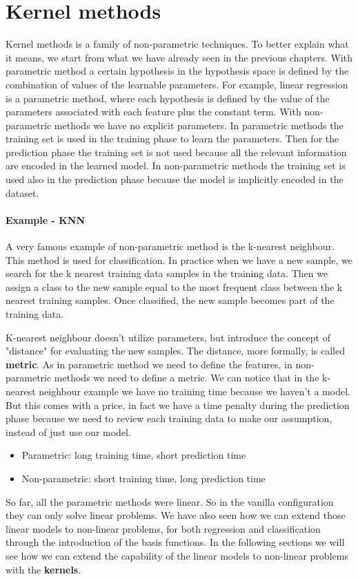 \documentclass[main.tex]{subfiles}
\begin{document}
\section{Kernel methods}
Kernel methods is a family of non-parametric techniques. To better explain what it means, we start from what we have already seen in the previous chapters. With parametric method a certain hypothesis in the hypothesis space is defined by the combination of values of the learnable parameters. For example, linear regression is a parametric method, where each hypothesis is defined by the value of the parameters associated with each feature plus the constant term.
With non-parametric methods we have no explicit parameters. %
In parametric methods the training set is used in the training phase to learn the parameters. Then for the prediction phase the training set is not used because all the relevant information are encoded in the learned model. In non-parametric methods the training set is used also in the prediction phase because the model is implicitly encoded in the dataset.
\paragraph{Example - KNN} A very famous example of non-parametric method is the k-nearest neighbour\footnotemark. This method is used for classification. In practice when we have a new sample, we search for the k nearest training data samples in the training data. Then we assign a class to the new sample equal to the most frequent class between the k nearest training samples. Once classified, the new sample becomes part of the training data. 

K-nearest neighbour doesn't utilize parameters, but introduce the concept of "distance" for evaluating the new samples. The distance, more formally, is called \textbf{metric}. As in parametric method we need to define the features, in non-parametric methods we need to define a metric.
We can notice that in the k-nearest neighbour example we have no training time because we haven't a model. But this comes with a price, in fact we have a time penalty during the prediction phase because we need to review each training data to make our assumption, instead of just use our model.
\begin{itemize}
    \item Parametric: long training time, short prediction time
    \item Non-parametric: short training time, long prediction time
\end{itemize}
So far, all the parametric methods were linear. So in the vanilla configuration they can only solve linear problems. We have also seen how we can extend those linear models to non-linear problems, for both regression and classification through the introduction of the basis functions. In the following sections we will see how we can extend the capability of the linear models to non-linear problems with the \textbf{kernels}.
\end{document}
